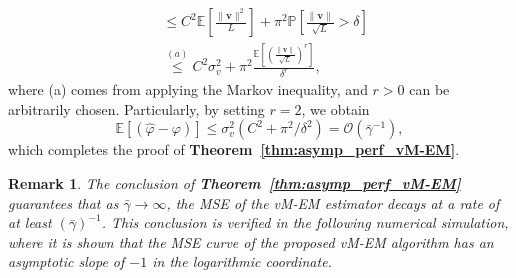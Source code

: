 \documentclass[journal,twocolumn]{IEEEtran}
\newtheorem{remark}{\bf Remark}
\theoremstyle{nonumberplain}
\begin{document}
{\begin{equation}
\begin{aligned}
    & \leq C^2 \mathbb{E}\left[\frac{\|{\bm v}\|^2}{L}\right] + \pi^2 \mathbb{P}\left[\frac{\|{\bm v}\|}{\sqrt{L}}>\delta\right] \\
    & \overset{(a)}{\leq} C^2\sigma_v^2 + \pi^2 \frac{\mathbb{E}\left[\left(\frac{\|{\bm v}\|}{\sqrt{L}}\right)^r\right]}{\delta^r},
    \end{aligned}
\end{equation}
\fi
where (a) comes from applying the Markov inequality, and $r>0$ can be arbitrarily chosen. Particularly, by setting $r=2$, we obtain 
\begin{equation}
    \mathbb{E}\left[(\hat{\varphi} - \varphi)\right] \leq \sigma_v^2(C^2+\pi^2/\delta^2) = \mathcal{O}(\bar{\gamma}^{-1}),  
\end{equation}
which completes the proof of {\bf Theorem~\ref{thm:asymp_perf_vM-EM}}. 

\begin{remark}
    The conclusion of {\bf Theorem~\ref{thm:asymp_perf_vM-EM}} guarantees that as $\bar{\gamma}\to\infty$, the MSE of the vM-EM estimator decays at a rate of at least $(\bar{\gamma})^{-1}$. This conclusion is verified in the following numerical simulation, where it is shown that the MSE curve of the proposed vM-EM algorithm has an asymptotic slope of $-1$ in the logarithmic coordinate. 
\end{remark}

}
\end{document}
